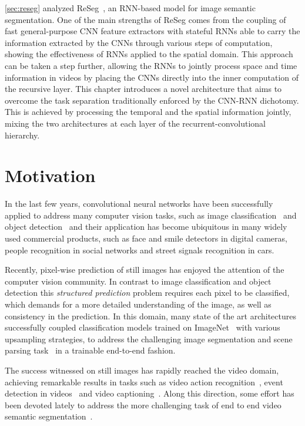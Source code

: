 \autoref{sec:reseg} analyzed ReSeg~\citep{Visin_2016_CVPR_Workshops}, an
RNN-based model for image semantic segmentation. One of the main strengths of
ReSeg comes from the coupling of fast general-purpose CNN feature extractors
with stateful RNNs able to carry the information extracted by the CNNs through
various steps of computation, showing the effectiveness of RNNs applied to the
spatial domain. This approach can be taken a step further, allowing the RNNs
to jointly process space and time information in videos by placing the CNNs
directly into the inner computation of the recursive layer. This chapter
introduces a novel architecture that aims to overcome the task separation
traditionally enforced by the CNN-RNN dichotomy. This is achieved by processing
the temporal and the spatial information jointly, mixing the two architectures
at each layer of the recurrent-convolutional hierarchy.


\section{Motivation}

In the last few years, convolutional neural networks have been
successfully applied to address many computer vision tasks, such as image
classification~\citep{Krizhevsky2012-alexnet,Simonyan2015,
Szegedy-et-al-arxiv2014} and object detection~\citep{Girshick-et-al-arxiv2013,
Sermanet13overfeat} and their application has become ubiquitous in many widely
used commercial products, such as face and smile detectors in digital cameras,
people recognition in social networks and street signals recognition in cars.

Recently, pixel-wise prediction of still images has enjoyed the attention
of the computer vision community. In contrast to image classification and
object detection this \emph{structured prediction} problem requires each
pixel to be classified, which demands for a more detailed understanding of
the image, as well as consistency in the prediction. In this domain, many
state of the art architectures successfully coupled classification models
trained on ImageNet~\citep{Simonyan14vgg,Szegedy15googlelenet} with various
upsampling strategies, to address the challenging image segmentation and scene
parsing task~\citep[see e.g.,~][]{long2014fully,noh2015learning} in a trainable
end-to-end fashion.

The success witnessed on still images has rapidly reached the video domain,
achieving remarkable results in tasks such as video action recognition~\citep{
simonyan2014two,karpathy2014large}, event detection in videos~\citep{
yeung2015end} and video captioning~\citep{yao2015describing}. Along this
direction, some effort has been devoted lately to address the more
challenging task of end to end video semantic segmentation~\citep{Tran16v2v}.

